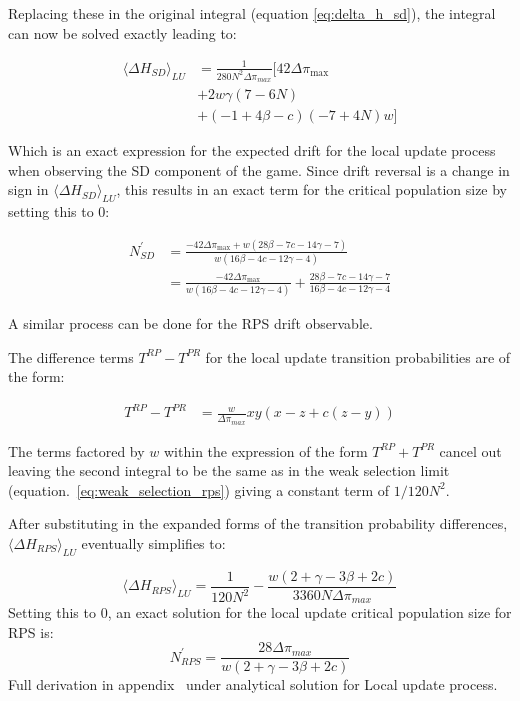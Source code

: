 \documentclass[%
 reprint,
 amsmath,amssymb,
 aps,
]{revtex4-2}
\begin{document}
Replacing these in the original integral (equation \ref{eq:delta_h_sd}), the integral can now be solved exactly
leading to:


\begin{align}
\langle \Delta H_{SD} \rangle_{LU} &= \frac{1}{280N^2 \Delta \pi_{max}} \Bigg[42 \Delta \pi_{\text{max}} \nonumber \\
&+ 2w \gamma (7 - 6N) \nonumber\\
&+ (-1+4\beta - c)(-7 + 4N)w \Bigg]
\end{align}



Which is an exact expression for the expected drift for the local update process when observing the SD
component of the game. Since drift reversal is a change in sign in $\langle \Delta H_{SD} \rangle_{LU}$, this 
results in an exact term for the critical population size by setting this to 0:



\begin{align}
N^\prime_{SD} &= \frac{-42 \Delta \pi_{\text{max}} + w(28\beta - 7c  - 14 \gamma - 7)}{w(16 \beta - 4c -12\gamma - 4)} \nonumber\\
&= \frac{-42 \Delta \pi_{\text{max}}}{w(16 \beta - 4c -12\gamma - 4)}
+ \frac{28 \beta - 7c - 14\gamma - 7}{16 \beta - 4c -12\gamma - 4}
\end{align}






A similar process can be done for the RPS drift observable.

The difference terms $T^{RP} - T^{PR}$ for the local update transition probabilities are of the form:

\begin{align}
T^{RP} - T^{PR} &=  \frac{w}{\Delta \pi_{max}}xy(x - z + c(z - y))
\end{align}

The terms factored by $w$ within the expression of the form $T^{RP} + T^{PR}$ cancel out leaving the second integral to be 
the same as in the weak selection limit (equation.~\ref{eq:weak_selection_rps}) giving a constant term 
of $1/120N^2$.



After substituting in the expanded forms of the transition probability differences, $\langle \Delta H_{RPS} \rangle_{LU}$
eventually simplifies to:

\begin{equation}
\langle \Delta H_{RPS} \rangle_{LU} = \frac{1}{120N^2} 
- \frac{w(2 + \gamma - 3\beta + 2c)}{3360N\Delta \pi_{max}}
\end{equation}
Setting this to 0, an exact solution for the local update critical 
population size for RPS is:
\begin{equation}
N^\prime_{RPS} = \frac{28\Delta \pi_{max}}{w(2 + \gamma -3\beta + 2c)}
\end{equation}
Full derivation in appendix~\cite{project_appendix} under analytical solution for Local update process.
\end{document}
